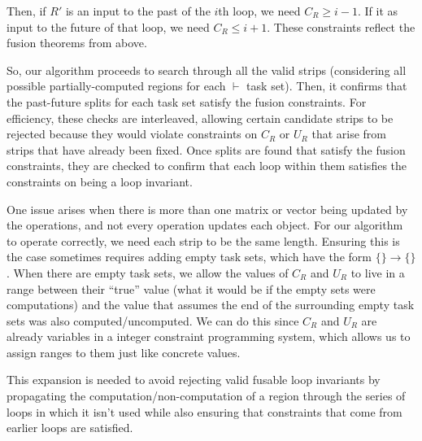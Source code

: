 \documentclass[12pt,letterpaper]{article}
\begin{document}
Then, if $R'$ is an input to the past of the $i$th loop, we need $C_R \geq i - 1$.
If it as input to the future of that loop, we need $C_R \leq i + 1$.
These constraints reflect the fusion theorems from above.

So, our algorithm proceeds to search through all the valid strips (considering all possible partially-computed regions for each $\vdash$ task set).
Then, it confirms that the past-future splits for each task set satisfy the fusion constraints.
For efficiency, these checks are interleaved, allowing certain candidate strips to be rejected because they would violate constraints on $C_R$ or $U_R$ that arise from strips that have already been fixed.
Once splits are found that satisfy the fusion constraints, they are checked to confirm that each loop within them satisfies the constraints on being a loop invariant.

One issue arises when there is more than one matrix or vector being updated by the operations, and not every operation updates each object.
For our algorithm to operate correctly, we need each strip to be the same length.
Ensuring this is the case sometimes requires adding empty task sets, which have the form $\{\} \to \{\}$.
When there are empty task sets, we allow the values of $C_R$ and $U_R$ to live in a range between their ``true'' value (what it would be if the empty sets were computations) and the value that assumes the end of the surrounding empty task sets was also computed/uncomputed.
We can do this since $C_R$ and $U_R$ are already variables in a integer constraint programming system, which allows us to assign ranges to them just like concrete values.

This expansion is needed to avoid rejecting valid fusable loop invariants by propagating the computation/non-computation of a region through the series of loops in which it isn't used while also ensuring that constraints that come from earlier loops are satisfied.
\end{document}
